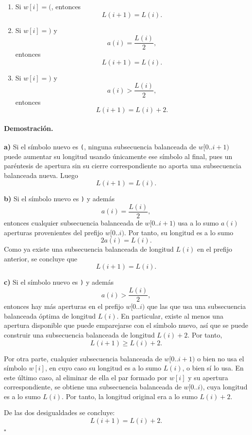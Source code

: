 \documentclass[11pt]{article}
\begin{document}
\begin{enumerate}[label=\alph*)]
    \item Si \(w[i]=\texttt{(}\), entonces
    \[
    L(i+1)=L(i).
    \]

    \item Si \(w[i]=\texttt{)}\) y
    \[
    a(i)=\frac{L(i)}{2},
    \]
    entonces
    \[
    L(i+1)=L(i).
    \]

    \item Si \(w[i]=\texttt{)}\) y
    \[
    a(i)>\frac{L(i)}{2},
    \]
    entonces
    \[
    L(i+1)=L(i)+2.
    \]
\end{enumerate}

\paragraph{Demostración.}
\textbf{a)} Si el símbolo nuevo es \texttt{(}, ninguna subsecuencia balanceada de
\(w[0..i+1)\) puede aumentar su longitud usando únicamente ese símbolo al final, pues
un paréntesis de apertura sin su cierre correspondiente no aporta una subsecuencia
balanceada nueva. Luego
\[
L(i+1)=L(i).
\]

\textbf{b)} Si el símbolo nuevo es \texttt{)} y además
\[
a(i)=\frac{L(i)}{2},
\]
entonces cualquier subsecuencia balanceada de \(w[0..i+1)\) usa a lo sumo \(a(i)\)
aperturas provenientes del prefijo \(w[0..i)\). Por tanto, su longitud es a lo sumo
\[
2a(i)=L(i).
\]
Como ya existe una subsecuencia balanceada de longitud \(L(i)\) en el prefijo anterior,
se concluye que
\[
L(i+1)=L(i).
\]

\textbf{c)} Si el símbolo nuevo es \texttt{)} y además
\[
a(i)>\frac{L(i)}{2},
\]
entonces hay más aperturas en el prefijo \(w[0..i)\) que las que usa una subsecuencia
balanceada óptima de longitud \(L(i)\). En particular, existe al menos una apertura
disponible que puede emparejarse con el símbolo nuevo, así que se puede construir una
subsecuencia balanceada de longitud \(L(i)+2\). Por tanto,
\[
L(i+1)\geq L(i)+2.
\]

Por otra parte, cualquier subsecuencia balanceada de \(w[0..i+1)\) o bien no usa el
símbolo \(w[i]\), en cuyo caso su longitud es a lo sumo \(L(i)\), o bien sí lo usa. En
este último caso, al eliminar de ella el par formado por \(w[i]\) y su apertura
correspondiente, se obtiene una subsecuencia balanceada de \(w[0..i)\), cuya longitud
es a lo sumo \(L(i)\). Por tanto, la longitud original era a lo sumo \(L(i)+2\).

De las dos desigualdades se concluye:
\[
L(i+1)=L(i)+2.
\]
\(\square\)
\end{document}
